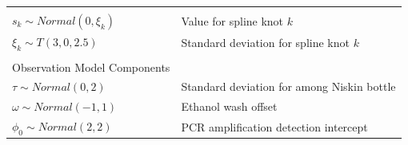\documentclass[
]{article}
\begin{document}
\begin{longtable}[]{@{}ll@{}}
\begin{minipage}[t]{0.47\columnwidth}
\end{minipage}\tabularnewline
\begin{minipage}[t]{0.47\columnwidth}\raggedright
\(s_k \sim Normal(0,\xi_k)\)\strut
\end{minipage} & \begin{minipage}[t]{0.47\columnwidth}\raggedright
Value for spline knot \(k\)\strut
\end{minipage}\tabularnewline
\begin{minipage}[t]{0.47\columnwidth}\raggedright
\(\xi_k \sim T(3,0,2.5)\)\strut
\end{minipage} & \begin{minipage}[t]{0.47\columnwidth}\raggedright
Standard deviation for spline knot \(k\)\strut
\end{minipage}\tabularnewline
\begin{minipage}[t]{0.47\columnwidth}\raggedright
\strut
\end{minipage} & \begin{minipage}[t]{0.47\columnwidth}\raggedright
\strut
\end{minipage}\tabularnewline
\begin{minipage}[t]{0.47\columnwidth}\raggedright
Observation Model Components\strut
\end{minipage} & \begin{minipage}[t]{0.47\columnwidth}\raggedright
\strut
\end{minipage}\tabularnewline
\begin{minipage}[t]{0.47\columnwidth}\raggedright
\(\tau \sim Normal(0,2)\)\strut
\end{minipage} & \begin{minipage}[t]{0.47\columnwidth}\raggedright
Standard deviation for among Niskin bottle\strut
\end{minipage}\tabularnewline
\begin{minipage}[t]{0.47\columnwidth}\raggedright
\(\omega \sim Normal(-1,1)\)\strut
\end{minipage} & \begin{minipage}[t]{0.47\columnwidth}\raggedright
Ethanol wash offset\strut
\end{minipage}\tabularnewline
\begin{minipage}[t]{0.47\columnwidth}\raggedright
\(\phi_0 \sim Normal(2,2)\)\strut
\end{minipage} & \begin{minipage}[t]{0.47\columnwidth}\raggedright
PCR amplification detection intercept\strut
\end{minipage}\tabularnewline

\end{longtable}
\end{document}
